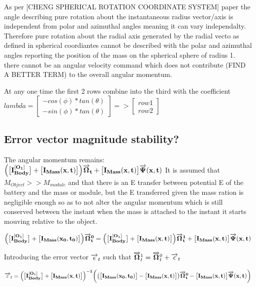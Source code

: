 As per [CHENG SPHERICAL ROTATION COORDINATE SYSTEM] paper the angle describing pure rotation about the instantaneous radius vector/axis is independent from polar and azimuthal angles meaning it can vary independalty. Therefore pure rotation about the radial axis generated by the radial vecto as defined in spherical coordiantes cannot be described with the polar and azimuthal angles reporting the position of the mass on the spherical sphere of radius 1. there cannot be an angular velocity command which does not contribute (FIND A BETTER TERM) to the overall angular momentum.

At any one time the first 2 rows combine into the third with the coefficient $lambda =\begin{bmatrix}
-cos(\phi)*tan(\theta) \\
-sin(\phi)*tan(\theta)
\end{bmatrix} => \begin{bmatrix}
row 1 \\row 2
\end{bmatrix}$

\subsection{Error vector magnitude stability?}
\label{Error vector magnitude stability?}
The angular momentum remains:
$ \Big(\big[\bf I^{[O_1]}_{Body}\big] +\big [I_{Mass}(x,t)\big]\Big) \overrightarrow{\bf \Omega}_{t}+\big [I_{Mass}(x,t)\big]\overrightarrow{\bf \Psi}(x,t)$
It is assumed that $M_{Object}>>M_{module}$ and that there is an E transfer between potential E of the battery and the mass or module, but the E transferred given the mass ration is negligible enough so as to not alter the angular momentum which is still conserved between the instant when the mass is attached to the instant it starts mouving relative to the object.

$ \Big(\big[\bf I^{[O_1]}_{Body}\big] +\big [I_{Mass}(x_0,t_0)\big]\Big) \overrightarrow{\bf \Omega}^{0}_{t}= \Big(\big[\bf I^{[O_1]}_{Body}\big] +\big [I_{Mass}(x,t)\big]\Big) \overrightarrow{\bf \Omega}^{1}_{t}+\big [I_{Mass}(x,t)\big]\overrightarrow{\bf \Psi}(x,t)$

Introducing the error vector $\overrightarrow{\bf \epsilon}_{t}$ such that $\overrightarrow{\bf \Omega}^{1}_{t}=\overrightarrow{\bf \Omega}^{0}_{t}+\overrightarrow{\bf \epsilon}_{t}$

$\overrightarrow{\bf \varepsilon}_{t}=\Big(\big[\bf I^{[O_1]}_{Body}\big] +\big [I_{Mass}(x,t)\big]\Big)^{-1}\bigg(\big(\big [I_{Mass}(x_0,t_0)\big]-\big [I_{Mass}(x,t)\big]\big) \overrightarrow{\bf \Omega}^{0}_{t}-\big [I_{Mass}(x,t)\big]\overrightarrow{\bf \Psi}(x,t) \bigg)$
